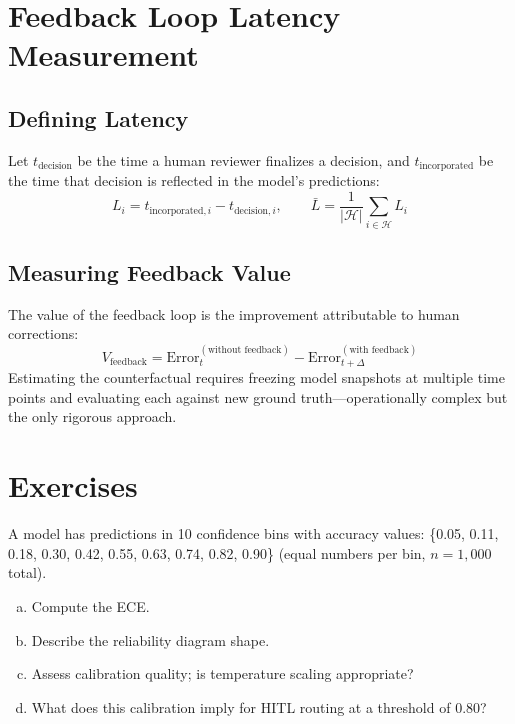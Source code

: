 \section{Feedback Loop Latency Measurement}

\subsection{Defining Latency}

Let $t_{\text{decision}}$ be the time a human reviewer finalizes a decision, and $t_{\text{incorporated}}$ be the time that decision is reflected in the model's predictions:
\[
L_i = t_{\text{incorporated},i} - t_{\text{decision},i}, \qquad
\bar{L} = \frac{1}{|\mathcal{H}|} \sum_{i \in \mathcal{H}} L_i
\]

\subsection{Measuring Feedback Value}

The value of the feedback loop is the improvement attributable to human corrections:
\[
V_{\text{feedback}} = \text{Error}_t^{(\text{without feedback})} - \text{Error}_{t+\Delta}^{(\text{with feedback})}
\]
Estimating the counterfactual requires freezing model snapshots at multiple time points and evaluating each against new ground truth---operationally complex but the only rigorous approach.

\section{Exercises}

\begin{Exercise}
A model has predictions in 10 confidence bins with accuracy values: \{0.05, 0.11, 0.18, 0.30, 0.42, 0.55, 0.63, 0.74, 0.82, 0.90\} (equal numbers per bin, $n=1{,}000$ total).
\begin{enumerate}[(a)]
    \item Compute the ECE.
    \item Describe the reliability diagram shape.
    \item Assess calibration quality; is temperature scaling appropriate?
    \item What does this calibration imply for HITL routing at a threshold of 0.80?
\end{enumerate}
\end{Exercise}

